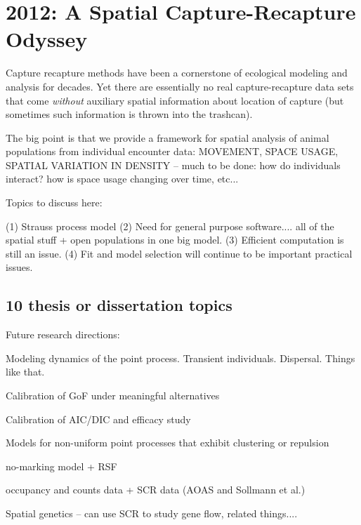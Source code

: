 


\chapter{
 2012: A Spatial Capture-Recapture Odyssey
 }

\label{chapt.final}

\vspace{0.3cm}


\vspace{2in}

Capture recapture methods have been a cornerstone of ecological
modeling and analysis for decades.  Yet there are essentially no real
capture-recapture data sets that come {\it without} auxiliary spatial
information about location of capture (but sometimes such information
is thrown into the trashcan). 

The big point is that we provide a framework for spatial analysis of animal populations from
individual encounter data:
MOVEMENT, SPACE USAGE, SPATIAL VARIATION IN DENSITY -- 
much to be done: how do individuals interact? how is space usage changing over time, etc...


Topics to discuss here:

(1) Strauss process model
(2) Need for general purpose software.... all of the spatial stuff + 
open populations in one big model. 
(3) Efficient computation is still an issue.
(4) Fit and model selection will continue to be important practical
 issues.

\section{10 thesis or dissertation topics}

Future research directions:

Modeling dynamics of the point process. Transient individuals. 
Dispersal. Things like that.

Calibration of GoF under meaningful alternatives

Calibration of AIC/DIC and efficacy study

Models for non-uniform point processes that exhibit clustering or
repulsion

no-marking model + RSF

occupancy and counts data + SCR data (AOAS and Sollmann et al.)

Spatial genetics  -- can use SCR to study gene flow, related things....

